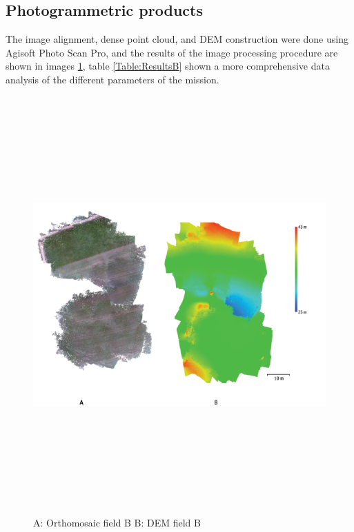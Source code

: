 \subsection{Photogrammetric products}
The image alignment, dense point cloud, and DEM construction were done using Agisoft Photo Scan Pro, and the results of the image processing procedure are shown in images \ref{fig:ResultBprocessing}, table \ref{Table:ResultsB} shown a more comprehensive data analysis of the different parameters of the mission.
\begin{figure}[H]
\centering
\includegraphics[width=16cm,height=16cm,keepaspectratio]{imagenes/ResutsB.png}
\caption{ A: Orthomosaic field B B: DEM field B}
\label{fig:ResultBprocessing}
\end{figure}

